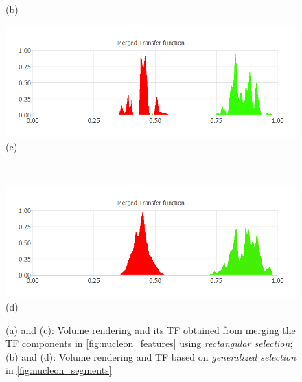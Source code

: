 \documentclass[twoside,twocolumn,10pt]{article}
\begin{document}
\begin{figure}
\begin{minipage}{.2\textwidth}
		(b)
	\end{minipage}
	\begin{minipage}{.245\textwidth}
		\centering
		\includegraphics[width=1\linewidth]{nucleon_green_red_Merged_Transfer_function}
		(c)
	\end{minipage}~
	\begin{minipage}{.245\textwidth}
		\centering
		\includegraphics[width=1\linewidth]{nucleon_green_red_segment_Merged_Transfer_function}
		(d)
	\end{minipage}
	\caption{(a) and (c): Volume rendering and its TF obtained from merging the TF components in \autoref{fig:nucleon_features} using \emph{rectangular selection}; (b) and (d): Volume rendering and TF based on \emph{generalized selection} in \autoref{fig:nucleon_segments}}
	\label{fig:nucleon_merged}
\end{figure}

\end{document}
